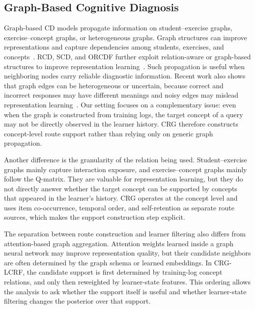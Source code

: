 \documentclass[conference]{IEEEtran}
\begin{document}
\subsection{Graph-Based Cognitive Diagnosis}
Graph-based CD models propagate information on student--exercise graphs, exercise--concept graphs, or heterogeneous graphs. Graph structures can improve representations and capture dependencies among students, exercises, and concepts~\cite{kipf2017gcn,velickovic2018gat,hamilton2017graphsage,he2020lightgcn,su2022gcdm}. RCD, SCD, and ORCDF further exploit relation-aware or graph-based structures to improve representation learning~\cite{gao2021rcd,wang2023scd,qian2024orcdf}. Such propagation is useful when neighboring nodes carry reliable diagnostic information. Recent work also shows that graph edges can be heterogeneous or uncertain, because correct and incorrect responses may have different meanings and noisy edges may mislead representation learning~\cite{wang2024uncertaintycd,shao2025isgcd,zhang2026ncdla}. Our setting focuses on a complementary issue: even when the graph is constructed from training logs, the target concept of a query may not be directly observed in the learner history. CRG therefore constructs concept-level route support rather than relying only on generic graph propagation.

Another difference is the granularity of the relation being used. Student--exercise graphs mainly capture interaction exposure, and exercise--concept graphs mainly follow the Q-matrix. They are valuable for representation learning, but they do not directly answer whether the target concept can be supported by concepts that appeared in the learner's history. CRG operates at the concept level and uses item co-occurrence, temporal order, and self-retention as separate route sources, which makes the support construction step explicit.

The separation between route construction and learner filtering also differs from attention-based graph aggregation. Attention weights learned inside a graph neural network may improve representation quality, but their candidate neighbors are often determined by the graph schema or learned embeddings. In CRG-LCRF, the candidate support is first determined by training-log concept relations, and only then reweighted by learner-state features. This ordering allows the analysis to ask whether the support itself is useful and whether learner-state filtering changes the posterior over that support.
\end{document}

